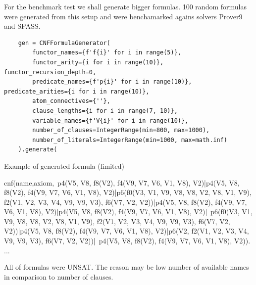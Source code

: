 For the benchmark test we shall generate bigger formulas.
100 random formulas were generated from this setup and were benchamarked agains solvers Prover9 and SPASS.

\begin{verbatim}
    gen = CNFFormulaGenerator(
        functor_names={f'f{i}' for i in range(5)},
        functor_arity={i for i in range(10)}, functor_recursion_depth=0,
        predicate_names={f'p{i}' for i in range(10)}, predicate_arities={i for i in range(10)},
        atom_connectives={''},
        clause_lengths={i for i in range(7, 10)},
        variable_names={f'V{i}' for i in range(10)},
        number_of_clauses=IntegerRange(min=800, max=1000),
        number_of_literals=IntegerRange(min=1000, max=math.inf)
    ).generate(
\end{verbatim}

\begin{listing}[H]
  \caption{Example of generated formula (limited)}
\begin{tptpcode}
% 
cnf(name,axiom,~p4(V5, V8, f8(V2), f4(V9, V7, V6, V1, V8), V2)|p4(V5, V8, f8(V2), f4(V9, V7, V6, V1, V8), V2)|p6(f0(V3, V1, V9, V8, V8, V2, V8, V1, V9), f2(V1, V2, V3, V4, V9, V9, V3), f6(V7, V2, V2))|p4(V5, V8, f8(V2), f4(V9, V7, V6, V1, V8), V2)|p4(V5, V8, f8(V2), f4(V9, V7, V6, V1, V8), V2)|~p6(f0(V3, V1, V9, V8, V8, V2, V8, V1, V9), f2(V1, V2, V3, V4, V9, V9, V3), f6(V7, V2, V2))|p4(V5, V8, f8(V2), f4(V9, V7, V6, V1, V8), V2)|p6(V2, f2(V1, V2, V3, V4, V9, V9, V3), f6(V7, V2, V2))|~p4(V5, V8, f8(V2), f4(V9, V7, V6, V1, V8), V2)).
...
\end{tptpcode}
\end{listing}

All of formulas were UNSAT. The reason may be low number of available names in comparison to number of clauses.

